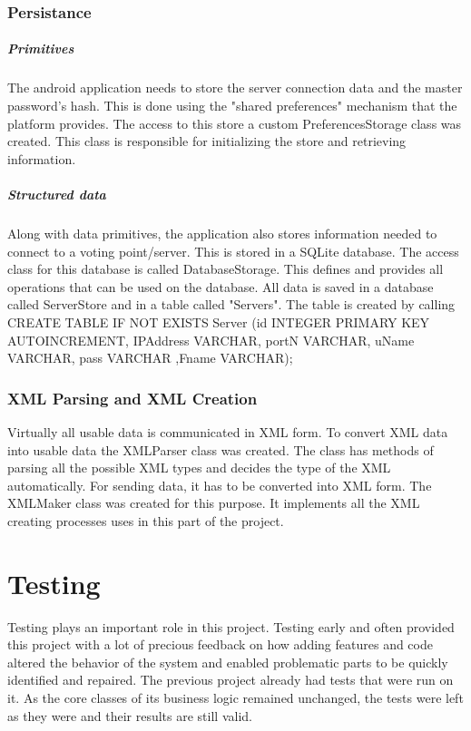 \documentclass[11pt,twoside,a4paper]{book}
\begin{document}
\subsection{Persistance}
\paragraph{Primitives}The android application needs to store the server connection data and the master password's hash. This is done using the "shared preferences" mechanism that the platform provides. The access to this store a custom PreferencesStorage class was created. This class is responsible for initializing the store and retrieving information. \\
\paragraph{Structured data}
Along with data primitives, the application also stores information needed to connect to a voting point/server. This is stored in a SQLite database. The access class for this database is called DatabaseStorage. This defines and provides all operations that can be used on the database. All data is saved in a database called ServerStore and in a table called "Servers". The table is created by calling 
CREATE TABLE IF NOT EXISTS Server (id INTEGER PRIMARY KEY AUTOINCREMENT, IPAddress VARCHAR, portN VARCHAR, uName VARCHAR, pass VARCHAR ,Fname VARCHAR);
\subsection{XML Parsing and XML Creation}
Virtually all usable data is communicated in XML form. To convert XML data into usable data the XMLParser class was created. The class has methods of parsing all the possible XML types and decides the type of the XML automatically. For sending data, it has to be converted into XML form. The XMLMaker class was created for this purpose. It implements all the XML creating processes uses in this part of the project.


\chapter{Testing}
Testing plays an important role in this project. Testing early and often provided this project with a lot of precious feedback on how adding features and code altered the behavior of the system and enabled problematic parts to be quickly identified and repaired. The previous project \cite{baklarkaJV} already had tests that were run on it. As the core classes of its business logic remained unchanged, the tests were left as they were and their results are still valid.
\end{document}
